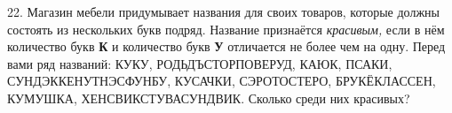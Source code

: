 22. Магазин мебели придумывает названия для своих товаров, которые должны состоять из нескольких букв подряд. Название признаётся {\it красивым,} если в нём количество букв {\bf К} и количество букв {\bf У} отличается не более чем на одну. Перед вами ряд названий: КУКУ, РОДЬДЪСТОРПОВЕРУД, КАЮК, ПСАКИ, СУНДЭККЕНУТНЭСФУНБУ, КУСАЧКИ, СЭРОТОСТЕРО, БРУКЁКЛАССЕН, КУМУШКА, ХЕНСВИКСТУВАСУНДВИК. Сколько среди них красивых?\\
